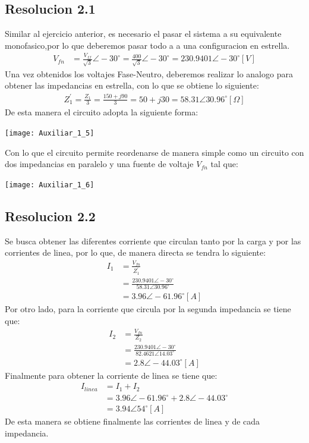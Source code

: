 \documentclass[
  11pt,
  letterpaper,
   addpoints,
  ]{exam}
\begin{document}
\begin{questions}
\begin{solution}
\subsection*{Resolucion 2.1}
    Similar al ejercicio anterior, es necesario el pasar el sistema a su equivalente monofasico,por lo que deberemos pasar todo a a una configuracion en estrella.
    \begin{align}
        V_{fn} &= \frac{V_{ff}}{\sqrt{3}}\angle -30^{\circ} 
               = \frac{400}{\sqrt{3}} \angle -30^{\circ} 
               = 230.9401 \angle -30^{\circ}[V]
    \end{align}
Una vez obtenidos los voltajes Fase-Neutro, deberemos realizar lo analogo para obtener las impedancias en estrella, con lo que se obtiene lo siguiente:
\begin{align}
    Z^{'}_{1}= \frac{Z_{1}}{3} = \frac{150 + j90}{3}= 50 + j30 = 58.31 \angle 30.96^{\circ} [\Omega]
\end{align}
De esta manera el circuito adopta la siguiente forma:
\begin{center}
    \texttt{[image: Auxiliar\_1\_5]}
  \end{center}
Con lo que el circuito permite reordenarse de manera simple como un circuito con dos impedancias en paralelo y una fuente de voltaje $V_{fn}$ tal que:
\begin{center}
    \texttt{[image: Auxiliar\_1\_6]}
  \end{center}
\subsection*{Resolucion 2.2}
Se busca obtener las diferentes corriente que circulan tanto por la carga y por las corrientes de linea, por lo que, de manera directa se tendra lo siguiente:
\begin{align}
    I_{1} &= \frac{V_{fn}}{Z^{'}_{1}}\\
          &= \frac{230.9401 \angle -30^{\circ}}{58.31 \angle 30.96^{\circ}}\\
            &= 3.96 \angle -61.96^{\circ} [A]
\end{align}
Por otro lado, para la corriente que circula por la segunda impedancia se tiene que:
\begin{align}
    I_{2} &= \frac{V_{fn}}{Z_{2}}\\
          &= \frac{230.9401 \angle -30^{\circ}}{82.4621 \angle 14.03^{\circ}}\\
            &= 2.8 \angle -44.03^{\circ} [A]
\end{align}
Finalmente para obtener la corriente de linea se tiene que:
\begin{align}
    I_{linea} &= I_{1} + I_{2}\\
              &= 3.96 \angle -61.96^{\circ} + 2.8 \angle -44.03^{\circ}\\
              &= 3.94\angle 54^{\circ} [A]
\end{align}
De esta manera se obtiene finalmente las corrientes de linea y de cada impedancia.

\end{solution}
\end{questions}
\end{document}
